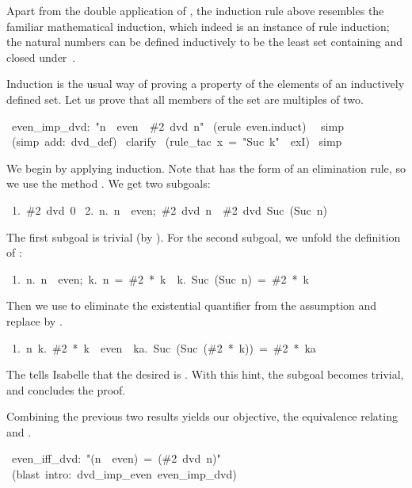 Apart from the double application of , the induction rule above
resembles the familiar mathematical induction, which indeed is an instance
of rule induction; the natural numbers can be defined inductively to be
the least set containing  and closed under~.

Induction is the usual way of proving a property of the elements of an
inductively defined set.  Let us prove that all members of the set
 are multiples of two.  
\begin{isabelle}
\ even_imp_dvd:\ "n\ \isasymin \ even\ \isasymLongrightarrow \ \#2\ dvd\ n"\isanewline
{}\ (erule\ even.induct)\isanewline
\ \ simp\isanewline
{}\ (simp\ add:\ dvd_def)\isanewline
{}\ clarify\isanewline
{}\ (rule_tac\ x\ =\ "Suc\ k"\ \ exI)\isanewline
{}\ simp\isanewline
{}
\end{isabelle}
%
We begin by applying induction.  Note that  has the form
of an elimination rule, so we use the method .  We get two
subgoals:
\begin{isabelle}
\ 1.\ \#2\ dvd\ 0\isanewline
\ 2.\ \isasymAnd n.\ \isasymlbrakk n\ \isasymin \ even;\ \#2\ dvd\ n\isasymrbrakk \ \isasymLongrightarrow \ \#2\ dvd\ Suc\ (Suc\ n)
\end{isabelle}
%
The first subgoal is trivial (by ).  For the second
subgoal, we unfold the definition of :
\begin{isabelle}
\ 1.\ \isasymAnd n.\ \isasymlbrakk n\ \isasymin \ even;\ \isasymexists k.\
n\ =\ \#2\ *\ k\isasymrbrakk \ \isasymLongrightarrow \ \isasymexists k.\
Suc\ (Suc\ n)\ =\ \#2\ *\ k
\end{isabelle}
%
Then we use
 to eliminate the existential quantifier from the assumption
and replace  by .
\begin{isabelle}
\ 1.\ \isasymAnd n\ k.\ \#2\ *\ k\ \isasymin \ even\ \isasymLongrightarrow \ \isasymexists ka.\ Suc\ (Suc\ (\#2\ *\ k))\ =\ \#2\ *\ ka%
\end{isabelle}
%
The  tells Isabelle that the desired
 is
\isa{Suc\ k}.  With this hint, the subgoal becomes trivial, and 
concludes the proof.

\medskip
Combining the previous two results yields our objective, the
equivalence relating  and . 
%
\begin{isabelle}
\ even_iff_dvd:\ "(n\ \isasymin \ even)\ =\ (\#2\ dvd\ n)"\isanewline
{}\ (blast\ intro:\ dvd_imp_even\ even_imp_dvd)\isanewline
\isacommand{done}
\end{isabelle}

